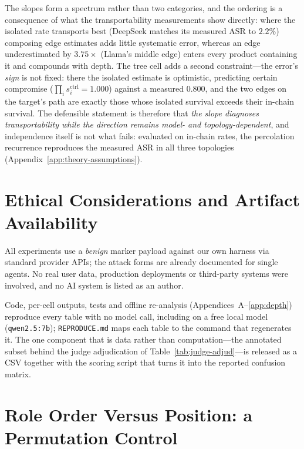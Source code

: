 \documentclass[sigconf,anonymous]{aamas}
\newcommand{\scite}[1]{\ensuremath{s^{\mathrm{ctrl}}_{#1}}}
\begin{document}
The slopes form a spectrum rather than two categories, and the ordering is a
consequence of what the transportability measurements show directly: where the
isolated rate transports best (DeepSeek matches its measured ASR to $2.2\%$)
composing edge estimates adds little systematic error, whereas an edge underestimated
by $3.75\times$ (Llama's middle edge) enters every product containing it and compounds
with depth. The tree cell adds a second constraint---the error's \emph{sign} is not
fixed: there the isolated estimate is optimistic, predicting certain compromise
($\prod_i \scite{i} = 1.000$) against a measured $0.800$, and the two edges on the
target's path are exactly those whose isolated survival exceeds their in-chain
survival. The defensible statement is therefore that \emph{the slope diagnoses
transportability while the direction remains model- and topology-dependent}, and
independence itself is not what fails: evaluated on in-chain rates, the percolation
recurrence reproduces the measured ASR in all three topologies
(Appendix~\ref{app:theory-assumptions}).

\section{Ethical Considerations and Artifact Availability}
\label{app:ethics}

All experiments use a \emph{benign} marker payload against our own harness via
standard provider APIs; the attack forms are already documented for single agents. No
real user data, production deployments or third-party systems were involved, and no
AI system is listed as an author.

Code, per-cell outputs, tests and offline re-analysis (Appendices~A--\ref{app:depth})
reproduce every table with no model call, including on a free local model
(\texttt{qwen2.5:7b}); \texttt{REPRODUCE.md} maps each table to the command that
regenerates it. The one component that is data rather than computation---the
annotated subset behind the judge adjudication of Table~\ref{tab:judge-adjud}---is
released as a CSV together with the scoring script that turns it into the reported
confusion matrix.

\section{Role Order Versus Position: a Permutation Control}
\label{app:role-permutation}
\end{document}
